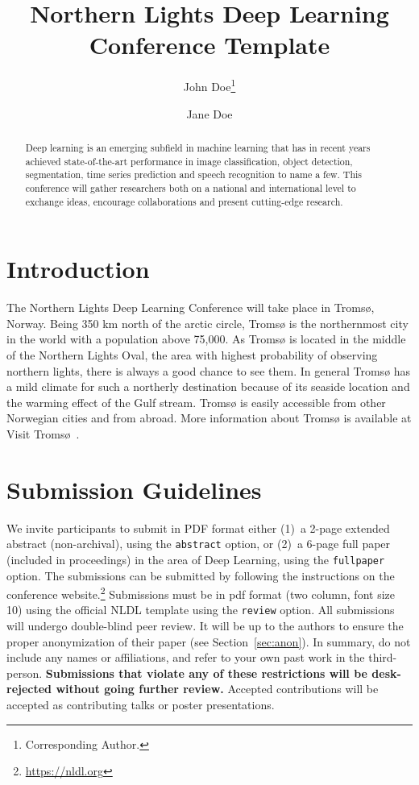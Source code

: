 \documentclass[fullpaper]{nldl}
\title{Northern Lights Deep Learning Conference Template}
\author[1]{John Doe\thanks{Corresponding Author.}}
\author[1,2]{Jane Doe}
\affil[1]{Affiliation 1}
\affil[2]{Affiliation 2}
\affil[ ]{\texttt{\{john.doe, jane.doe\}@affiliation.com}}
\begin{document}
\maketitle

\begin{abstract}
Deep learning is an emerging subfield in machine learning that has in recent years achieved state-of-the-art performance in image classification, object detection, segmentation, time series prediction and speech recognition to name a few.
This conference will gather researchers both on a national and international level to exchange ideas, encourage collaborations and present cutting-edge research.
\end{abstract}

\section{Introduction}
The Northern Lights Deep Learning Conference will take place in Troms{\o}, Norway.
Being 350 km north of the arctic circle, Troms{\o} is the northernmost city in the world with a population above 75,000.
As Troms{\o} is located in the middle of the Northern Lights Oval, the area with highest probability of observing northern lights, there is always a good chance to see them.
In general Troms{\o} has a mild climate for such a northerly destination because of its seaside location and the warming effect of the Gulf stream.
Troms{\o} is easily accessible from other Norwegian cities and from abroad.
More information about Troms{\o} is available at Visit Troms{\o}~\cite{tromso}.

\section{Submission Guidelines}
We invite participants to submit in PDF format either (1)~a 2-page extended abstract (non-archival), using the \verb|abstract| option, or (2)~a 6-page full paper (included in proceedings) in the area of Deep Learning, using the \verb|fullpaper| option.
The submissions can be submitted by following the instructions on the conference website.\footnote{\url{https://nldl.org}}
Submissions must be in pdf format (two column, font size 10) using the official NLDL template using the \verb|review| option.
All submissions will undergo double-blind peer review.
It will be up to the authors to ensure the proper anonymization of their paper (see Section~\ref{sec:anon}).
In summary, do not include any names or affiliations, and refer to your own past work in the third-person.
\textbf{Submissions that violate any of these restrictions will be desk-rejected without going further review.}
Accepted contributions will be accepted as contributing talks or poster presentations.
\end{document}
